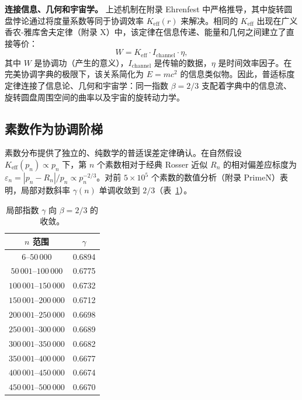 \documentclass[12pt]{article}
\begin{document}
	\textbf{连接信息、几何和宇宙学。}
	上述机制在附录 Ehrenfest 中严格推导，其中旋转圆盘悖论通过将度量系数等同于协调效率 \(K_{\mathrm{eff}}(r)\) 来解决。相同的 \(K_{\mathrm{eff}}\) 出现在广义香农-雅库舍夫定律（附录 X）中，该定律在信息传递、能量和几何之间建立了直接等价：
	\begin{equation}
		W = K_{\mathrm{eff}} \cdot I_{\text{channel}} \cdot \eta,
	\end{equation}
	其中 \(W\) 是协调功（产生的意义），\(I_{\text{channel}}\) 是传输的数据，\(\eta\) 是时间效率因子。在完美协调字典的极限下，该关系简化为 \(E = mc^2\) 的信息类似物。因此，普适标度定律连接了信息论、几何和宇宙学：同一指数 \(\beta = 2/3\) 支配着字典中的信息流、旋转圆盘周围空间的曲率以及宇宙的旋转动力学。
	
	\subsection{素数作为协调阶梯}
	
	素数分布提供了独立的、纯数学的普适误差定律确认。在自然假设 \(K_{\mathrm{eff}}(p_n) \propto p_n\) 下，第 \(n\) 个素数相对于经典 Rosser 近似 \(R_n\) 的相对偏差应标度为 \(\varepsilon_n = |p_n - R_n|/p_n \propto p_n^{-2/3}\)。对前 \(5\times10^5\) 个素数的数值分析（附录 PrimeN）表明，局部对数斜率 \(\gamma(n)\) 单调收敛到 \(2/3\)（表~\ref{tab:prime-slopes}）。
	
	\begin{table}[H]
		\centering
		\caption{局部指数 \(\gamma\) 向 \(\beta = 2/3\) 的收敛。}
		\label{tab:prime-slopes}
		\begin{tabular}{c c}
			\toprule
			\(n\) 范围 & \(\gamma\) \\
			\midrule
			\(6\)--\(50\,000\)    & 0.6894 \\
			\(50\,001\)--\(100\,000\) & 0.6775 \\
			\(100\,001\)--\(150\,000\)& 0.6732 \\
			\(150\,001\)--\(200\,000\)& 0.6712 \\
			\(200\,001\)--\(250\,000\)& 0.6698 \\
			\(250\,001\)--\(300\,000\)& 0.6689 \\
			\(300\,001\)--\(350\,000\)& 0.6682 \\
			\(350\,001\)--\(400\,000\)& 0.6677 \\
			\(400\,001\)--\(450\,000\)& 0.6674 \\
			\(450\,001\)--\(500\,000\)& 0.6670 \\
			\bottomrule
		\end{tabular}
	\end{table}
	
\end{document}
